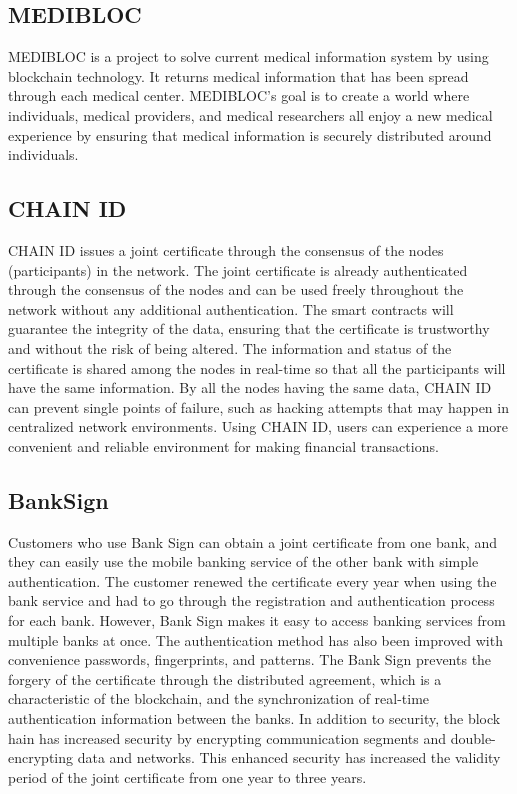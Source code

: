 \documentclass[conference]{IEEEtran}
\begin{document}
\subsection{MEDIBLOC}
MEDIBLOC is a project to solve current medical information system by using blockchain technology. It returns medical information that has been spread through each medical center. MEDIBLOC's goal is to create a world where individuals, medical providers, and medical researchers all enjoy a new medical experience by ensuring that medical information is securely distributed around individuals.

\subsection{CHAIN ID}
CHAIN ID issues a joint certificate through the consensus of the nodes (participants) in the network. The joint certificate is already authenticated through the consensus of the nodes and can be used freely throughout the network without any additional authentication. The smart contracts will guarantee the integrity of the data, ensuring that the certificate is trustworthy and without the risk of being altered. The information and status of the certificate is shared among the nodes in real-time so that all the participants will have the same information. By all the nodes having the same data, CHAIN ID can prevent single points of failure, such as hacking attempts that may happen in centralized network environments. Using CHAIN ID, users can experience a more convenient and reliable environment for making financial transactions.

\subsection{BankSign}
Customers who use Bank Sign can obtain a joint certificate from one bank, and they can easily use the mobile banking service of the other bank with simple authentication. The customer renewed the certificate every year when using the bank service and had to go through the registration and authentication process for each bank. However, Bank Sign makes it easy to access banking services from multiple banks at once. The authentication method has also been improved with convenience passwords, fingerprints, and patterns. The Bank Sign prevents the forgery of the certificate through the distributed agreement, which is a characteristic of the blockchain, and the synchronization of real-time authentication information between the banks. In addition to security, the block hain has increased security by encrypting communication segments and double-encrypting data and networks. This enhanced security has increased the validity period of the joint certificate from one year to three years.
\end{document}
